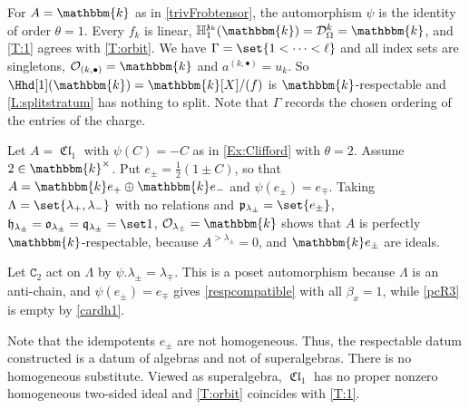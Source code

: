 \documentclass[a4paper,11pt]{amsart}
\numberwithin{equation}{subsection}
\theoremstyle{definition}
\theoremstyle{theorem}
\theoremstyle{remark}
\DeclareMathOperator\Cl{\mathfrak{Cl}}
\newcommand\CO{\mathcal{O}}
\newcommand\kapp{{\mathfrak{z}}}
\newcommand\plam[1][\lambda]{\mathfrak{p}_{#1}}
\newcommand\hlam[1][\lambda]{\mathfrak{h}_{#1}}
\newcommand\qlam[1][\lambda]{\mathfrak{q}_{#1}}
\newcommand\Olam[1][\lambda]{\CO_{#1}}
\newcommand\olam[1][\lambda]{\mathfrak{o}_{#1}}
\newcommand\HH{\mathbb{H}}
\newcommand\kk{\mathbbm{k}}
\begin{document}
\begin{Example}\label{Ex:orbittrivial}
  For $A=\kk$ as in \autoref{trivFrobtensor}, the automorphism $\psi$ is the
  identity of order $\theta=1$. Every $f_k$ is linear,
  $\HH^{\kapp_k}_1(\kk)=\mathcal{D}^{k}_\Omega=\kk$, and \autoref{T:1} agrees with
  \autoref{T:orbit}. We have $\Gamma=\set{1<\dots<\ell}$ and all index sets are
  singletons, $\Olam[(k,\bullet)]=\kk$ and $a^{(k,\bullet)}=u_k$. So
  $\Hhd[1](\kk)=\kk[X]/(f)$ is $\kk$-respectable and \autoref{L:splitstratum} has nothing to split. Note that $\Gamma$ records the chosen ordering of the
  entries of the charge.
\end{Example}

\begin{Example}\label{Ex:orbitClifford}
Let $A=\Cl_1$ with $\psi(C)=-C$ as in \autoref{Ex:Clifford} with
$\theta=2$. Assume $2\in\kk^{\times}$. Put $e_\pm=\tfrac12(1\pm C)$, so
that $A=\kk e_+\oplus\kk e_-$ and $\psi(e_\pm)=e_\mp$. Taking $\Lambda=\set{\lambda_+,\lambda_-}$ with no
relations and $\plam[\lambda_\pm]=\set{e_\pm}$,
$\hlam[\lambda_\pm]=\olam[\lambda_\pm]=\qlam[\lambda_\pm]=\set1$,
$\Olam[\lambda_\pm]=\kk$ shows that $A$ is perfectly $\kk$-respectable, because
$A^{>\lambda_\pm}=0$, and $\kk e_\pm$ are ideals.

Let $\mathtt{C}_2$ act on $\Lambda$ by
$\psi.\lambda_\pm=\lambda_\mp$. This is a poset automorphism because
$\Lambda$ is an anti-chain, and $\psi(e_\pm)=e_\mp$ gives
\autoref{respcompatible} with all $\beta_x=1$, while \autoref{pcR3} is empty by
\autoref{cardh1}.

Note that the idempotents $e_\pm$ are not homogeneous. Thus, the respectable datum constructed  is
a datum of algebras and not of superalgebras. There is no homogeneous
substitute. Viewed as superalgebra, $\Cl_1$ has no proper nonzero homogeneous two-sided
ideal and  \autoref{T:orbit} coincides with
\autoref{T:1}.
\end{Example}
\end{document}
